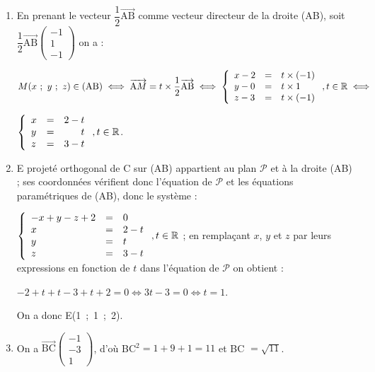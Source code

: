\documentclass[10pt]{article}
\providecommand{\R}{\mathbb{R}}
\providecommand{\vect}[1]{\overrightarrow{#1}}
\begin{document}
\begin{enumerate}
\begin{enumerate}
Avec $\vect{\text{C}M}\begin{pmatrix}x + 1\\y + 1\\z - 2\end{pmatrix}$, on obtient :

$-2(x + 1) + 2(y + 1) -2(z - 2) = 0 \iff -(x + 1) + (y + 1) - (z - 2) = 0 \iff - x + y - z + 2 = 0$.
		\item 
		En prenant le vecteur $\dfrac{1}{2}\vect{\text{AB}}$ comme vecteur directeur de la droite (AB), soit $\dfrac12\vect{\text{AB}}\begin{pmatrix}-1\\1\\-1\end{pmatrix}$ on a :
		
$M(x~;~y~;~z) \in (\text{AB}) \iff \vect{\text{A}M} = t\times \dfrac12\vect{\text{AB}} \iff \left\{\begin{array}{l c l}
x - 2&=&t \times (- 1)\\
y - 0 &=&t \times 1\\
z - 3&=&t \times (-1)
\end{array}\right., t \in \R \iff$

$ \left\{\begin{array}{l c r}
x &=& 2 - t\\
y &=&t \\
z &=& 3 - t 
\end{array}\right., t \in \R$.
		\item 

E projeté orthogonal de C sur (AB) appartient au plan $\mathcal{P}$ et à la droite (AB) ; ses coordonnées vérifient donc l'équation de $\mathcal{P}$ et les équations paramétriques de (AB), donc le système :

$\left\{\begin{array}{l c l}
- x + y - z + 2 &=& 0\\
x &=& 2 - t\\
y &=&t \\
z &=& 3 - t 
\end{array}\right., t \in \R$ ; en remplaçant $x$, $y$ et $z$ par leurs expressions en fonction de $t$ dans l'équation de $\mathcal{P}$ on obtient :

$- 2 + t  + t - 3 + t + 2 = 0\iff 3t - 3 = 0 \iff t = 1$.

On a donc E(1~;~1~;~2).
		\item 
On a $\vect{\text{BC}}\begin{pmatrix}-1\\-3\\1\end{pmatrix}$, d'où BC$^2 = 1 + 9 + 1 = 11$ et BC $ = \sqrt{11}$.
		

\end{enumerate}
\end{enumerate}
\end{document}
